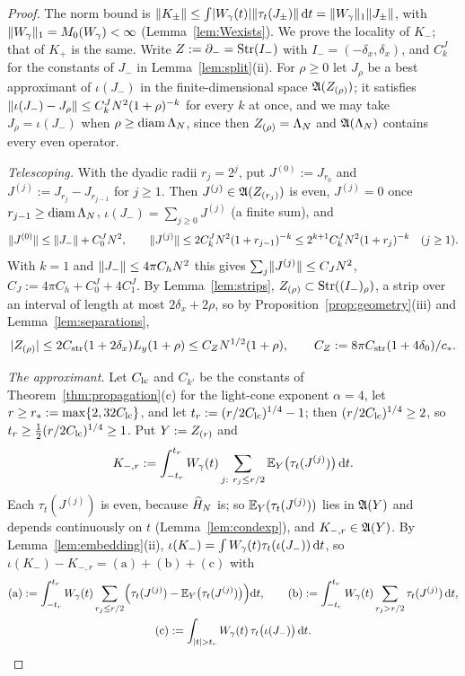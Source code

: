 \begin{proof}
The norm bound is $\lVert K_\pm\rVert\le\int\lvert W_{\gamma}(t)\rvert\lVert\tau_t(J_\pm)\rVert\,\mathrm{d} t=\lVert W_{\gamma}\rVert_1\lVert J_\pm\rVert$, with
$\lVert W_{\gamma}\rVert_1=M_0(W_{\gamma})<\infty$ (Lemma~\ref{lem:Wexists}). We prove the locality of $K_-$; that of $K_+$ is the same.
Write $Z:=\partial_{-}=\mathrm{Str}(I_-)$ with $I_-=(-\delta_x,\delta_x)$, and $C^J_k$ for the constants of $J_-$ in
Lemma~\ref{lem:split}(ii). For $\rho\ge0$ let $J_\rho$ be a best approximant of $\iota(J_-)$ in the finite-dimensional space
$\mathfrak{A}(Z_{(\rho)})$; it satisfies $\lVert\iota(J_-)-J_\rho\rVert\le C^J_kN^2(1+\rho)^{-k}$ for every $k$ at once, and we may take
$J_\rho=\iota(J_-)$ when $\rho\ge\operatorname{diam}\Lambda_N$, since then $Z_{(\rho)}=\Lambda_N$ and $\mathfrak{A}(\Lambda_N)$ contains every even operator.

\emph{Telescoping.} With the dyadic radii $r_j=2^j$, put $J^{(0)}:=J_{r_0}$ and $J^{(j)}:=J_{r_j}-J_{r_{j-1}}$ for $j\ge1$.
Then $J^{(j)}\in\mathfrak{A}(Z_{(r_j)})$ is even, $J^{(j)}=0$ once $r_{j-1}\ge\operatorname{diam}\Lambda_N$, $\iota(J_-)=\sum_{j\ge0}J^{(j)}$ (a finite
sum), and
\[
\lVert J^{(0)}\rVert\le\lVert J_-\rVert+C^J_0N^2,\qquad
\lVert J^{(j)}\rVert\le2C^J_kN^2(1+r_{j-1})^{-k}\le2^{k+1}C^J_kN^2(1+r_j)^{-k}\quad(j\ge1).
\]
With $k=1$ and $\lVert J_-\rVert\le4\pi C_hN^2$ this gives $\sum_j\lVert J^{(j)}\rVert\le C_JN^2$, $C_J:=4\pi C_h+C^J_0+4C^J_1$. By
Lemma~\ref{lem:strips}, $Z_{(\rho)}\subset\mathrm{Str}((I_-)_\rho)$, a strip over an interval of length at most $2\delta_x+2\rho$, so
by Proposition~\ref{prop:geometry}(iii) and Lemma~\ref{lem:separations},
\begin{equation}\label{eq:ix-stripcount}
\lvert Z_{(\rho)}\rvert\le2C_{\rm str}(1+2\delta_x)L_y(1+\rho)\le C_ZN^{1/2}(1+\rho),\qquad C_Z:=8\pi C_{\rm str}(1+4\delta_0)/c_* .
\end{equation}

\emph{The approximant.} Let $C_{\rm lc}$ and $C_{k'}$ be the constants of Theorem~\ref{thm:propagation}(c) for the light-cone
exponent $\alpha=4$, let $r\ge r_*:=\max\{2,32C_{\rm lc}\}$, and let $t_r:=(r/2C_{\rm lc})^{1/4}-1$; then $(r/2C_{\rm lc})^{1/4}\ge2$, so
$t_r\ge\frac12(r/2C_{\rm lc})^{1/4}\ge1$. Put $Y:=Z_{(r)}$ and
\[
K_{-,r}:=\int_{-t_r}^{t_r}W_{\gamma}(t)\sum_{j:\ r_j\le r/2}\mathbb{E}_Y\bigl(\tau_t(J^{(j)})\bigr)\,\mathrm{d} t .
\]
Each $\tau_t(J^{(j)})$ is even, because $\widehat{H}_N$ is; so $\mathbb{E}_Y(\tau_t(J^{(j)}))$ lies in $\mathfrak{A}(Y)$ and depends
continuously on $t$ (Lemma~\ref{lem:condexp}), and $K_{-,r}\in\mathfrak{A}(Y)$. By Lemma~\ref{lem:embedding}(ii),
$\iota(K_-)=\int W_{\gamma}(t)\tau_t(\iota(J_-))\,\mathrm{d} t$, so $\iota(K_-)-K_{-,r}=\mathrm{(a)}+\mathrm{(b)}+\mathrm{(c)}$ with
\begin{gather*}
\mathrm{(a)}:=\int_{-t_r}^{t_r}W_{\gamma}(t)\sum_{r_j\le r/2}\Bigl(\tau_t(J^{(j)})-\mathbb{E}_Y\bigl(\tau_t(J^{(j)})\bigr)\Bigr)\mathrm{d} t,\qquad
\mathrm{(b)}:=\int_{-t_r}^{t_r}W_{\gamma}(t)\sum_{r_j>r/2}\tau_t(J^{(j)})\,\mathrm{d} t,\\
\mathrm{(c)}:=\int_{\lvert t\rvert>t_r}W_{\gamma}(t)\,\tau_t\bigl(\iota(J_-)\bigr)\,\mathrm{d} t .
\end{gather*}


\end{proof}
